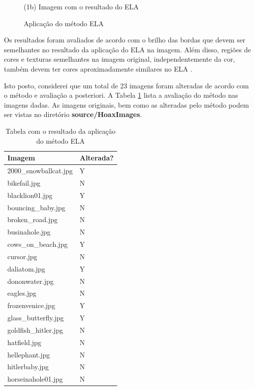 \documentclass[12pt]{article}
\begin{document}
\begin{itemize}
\begin{itemize}
\begin{figure}[htb]
\begin{minipage}[b]{0.45\textwidth}
	\centerline{\small (1b) Imagem com o resultado do ELA}
\end{minipage}
\caption{Aplicação do método ELA}
\label{fig1}
\end{figure}

Os resultados foram avaliados de acordo com o brilho das bordas que devem ser semelhantes no resultado 
da aplicação do ELA na imagem. Além disso, regiões de cores e texturas semelhantes na imagem
original, independentemente da cor, também devem ter cores aproximadamente similares no ELA \cite{berkeleywebsite}.

Isto posto, considerei que um total de 23 imagens foram alteradas de acordo com o método e avaliação a posteriori. 
A Tabela \ref{table-hoax-imgs} lista a avaliação do método nas imagens dadas. As imagens originais, bem como as
alteradas pelo método podem ser vistas no diretório \textbf{source/HoaxImages}.
\begin{table}[]
\centering
\caption{Tabela com o resultado da aplicação do método ELA}
\label{table-hoax-imgs}
\begin{tabular}{|l|l|} \hline
Imagem                 & Alterada? \\ \hline
2000\_snowballcat.jpg  & Y         \\
bikefail.jpg           & N         \\
blacklion01.jpg        & Y         \\
bouncing\_baby.jpg     & N         \\
broken\_road.jpg       & N         \\
businahole.jpg         & N         \\
cows\_on\_beach.jpg    & Y         \\
cursor.jpg             & N         \\
daliatom.jpg           & Y         \\
dononwater.jpg         & N         \\
eagles.jpg             & N         \\
frozenvenice.jpg       & Y         \\
glass\_butterfly.jpg   & Y         \\
goldfish\_hitler.jpg   & N         \\
hatfield.jpg           & N         \\
hellephant.jpg         & N         \\
hitlerbaby.jpg         & N         \\
horseinahole01.jpg     & N         \\

\end{tabular}
\end{table}
\end{itemize}
\end{itemize}
\end{document}
